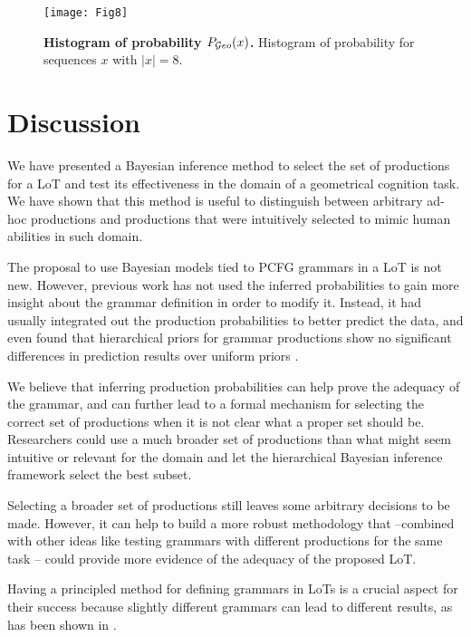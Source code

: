 \begin{figure}[!ht]
    \centering
    \texttt{[image: Fig8]}
    \caption{{\bf Histogram of probability $P_{\mathcal Geo}(x)$.} Histogram of probability for sequences $x$ with $|x| = 8$.}
    \label{fig:codP:8}
\end{figure}


\section{Discussion}

We have presented a Bayesian inference method to select the set of productions for a LoT and test its effectiveness in the domain of a geometrical cognition task. We have shown that this method is useful to distinguish between arbitrary ad-hoc productions and productions that were intuitively selected to mimic human abilities in such domain.

The proposal to use Bayesian models tied to PCFG grammars in a LoT is not new. However, previous work has not used the inferred probabilities to gain more insight about the grammar definition in order to modify it. Instead, it had usually integrated out the production probabilities to better predict the data, and even found that hierarchical priors for grammar productions show no significant differences in prediction results over uniform priors \cite{piantadosi2012bootstrapping,yildirim2015learning}.

We believe that inferring production probabilities can help prove the adequacy of the grammar, and can further lead to a formal mechanism for selecting the correct set of productions when it is not clear what a proper set should be. Researchers could use a much broader set of productions than what might seem intuitive or relevant for the domain and let the hierarchical Bayesian inference framework select the best subset.

Selecting a broader set of productions still leaves some arbitrary decisions to be made. However, it can help to build a more robust methodology that --combined with other ideas like testing grammars with different productions for the same task \cite{piantadosi2016logical}-- could provide more evidence of the adequacy of the proposed LoT.

Having a principled method for defining grammars in LoTs is a crucial aspect for their success because slightly different grammars can lead to different results, as has been shown in \cite{piantadosi2016logical}.

